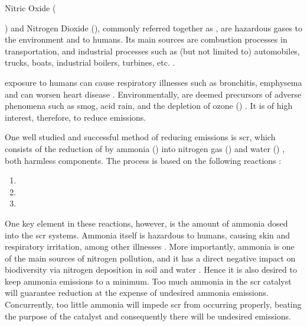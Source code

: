 Nitric Oxide ({) and Nitrogen Dioxide (), commonly referred together as \nox,  are hazardous gases to the environment and to humans. Its main sources are combustion processes in transportation, and industrial processes such as (but not limited to) automobiles, trucks, boats, industrial boilers, turbines, etc. \parencite{EPA_2019}.

\nox exposure to humans can cause respiratory illnesses such as bronchitis, emphysema and can worsen heart disease \parencite{Boningari_2016}. Environmentally, \nox are deemed precursors of adverse phenomena such as smog, acid rain, and the depletion of ozone () \parencite{Bernabeo_2019}. It is of high interest, therefore, to reduce \nox emissions.

One well studied and successful method of reducing emissions is \acrfull{scr}, which consists of the reduction of \nox by ammonia () into nitrogen gas () and water () \parencite{Forzatti_2001}, both harmless components. The process is based on the following reactions \parencite{Forzatti_2001}:

\begin{center}
	\begin{varwidth}{\textwidth}
		\begin{enumerate}
			\item[]  
			\item[]  
			\item[]  
		\end{enumerate}
	\end{varwidth}
\end{center}

One key element in these reactions, however, is the amount of ammonia dosed into the \acrshort{scr} systems. Ammonia itself is hazardous to humans, causing skin and respiratory irritation, among other illnesses \parencite{ASTDRA_2004}. More importantly, ammonia is one of the main sources of nitrogen pollution, and it has a direct negative impact on biodiversity via nitrogen deposition in soil and water \parencite{RAND_2018}. Hence it is also desired to keep ammonia emissions to a minimum. Too much ammonia in the \acrshort{scr} catalyst will guarantee \nox reduction at the expense of undesired ammonia emissions. Concurrently, too little ammonia will impede \acrshort{scr} from occurring properly, beating the purpose of the catalyst and consequently there will be undesired \nox emissions.

}
